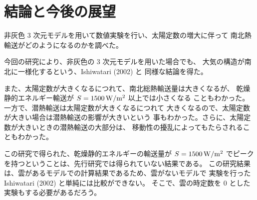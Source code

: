 \documentclass[body]{subfiles}
\begin{document}
\chapter{結論と今後の展望}

非灰色 3 次元モデルを用いて数値実験を行い、太陽定数の増大に伴って
南北熱輸送がどのようになるのかを調べた。

今回の研究により、非灰色の 3 次元モデルを用いた場合でも、
大気の構造が南北に一様化するという、Ishiwatari \etal (2002) と
同様な結論を得た。

また、太陽定数が大きくなるにつれて、南北総熱輸送量は大きくなるが、
乾燥静的エネルギー輸送が \(S=1500\hmu{W/m^2}\) 以上では小さくなる
こともわかった。一方で、潜熱輸送は太陽定数が大きくなるにつれて
大きくなるので、太陽定数が大きい場合は潜熱輸送の影響が大きいという
事もわかった。さらに、太陽定数が大きいときの潜熱輸送の大部分は、
移動性の擾乱によってもたらされることもわかった。

この研究で得られた、乾燥静的エネルギーの輸送量が \(S=1500\hmu{W/m^2}\)
でピークを持つということは、先行研究では得られていない結果である。
この研究結果は、雲があるモデルでの計算結果であるため、雲がないモデルで
実験を行った Ishiwatari \etal (2002) と単純には比較ができない。
そこで、雲の時定数を 0 とした実験もする必要があるだろう。
\end{document}
